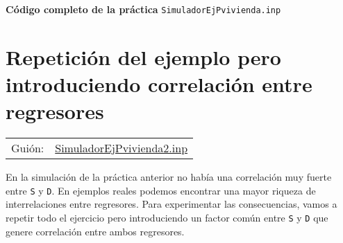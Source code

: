 \documentclass[11pt]{article}
\begin{document}
\vspace{10pt}
\noindent
\textbf{Código completo de la práctica} \texttt{SimuladorEjPvivienda.inp}
\vspace{10pt}

\clearpage


\section{Repetición del ejemplo pero introduciendo correlación entre regresores}
\label{sec:org9331309}
\begin{center}
\begin{tabular}{ll}
Guión: & \href{https://github.com/mbujosab/Ectr/tree/master/Practicas/Gretl/scripts/SimuladorEjPvivienda2.inp}{SimuladorEjPvivienda2.inp}\\[0pt]
\end{tabular}
\end{center}

En la simulación de la práctica anterior no había una correlación muy
fuerte entre \texttt{S} y \texttt{D}. En ejemplos reales podemos encontrar una mayor
riqueza de interrelaciones entre regresores.  Para experimentar las
consecuencias, vamos a repetir todo el ejercicio pero introduciendo un
factor común entre \texttt{S} y \texttt{D} que genere correlación entre ambos
regresores.
\end{document}

